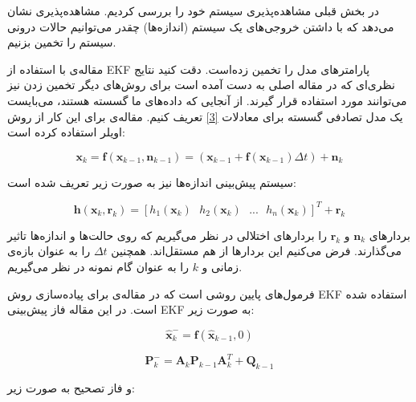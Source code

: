 \documentclass[11pt, fleqn]{article}
\begin{document}
\begin{multicols}{2}
در بخش قبلی مشاهده‌پذیری سیستم خود را بررسی کردیم. مشاهده‌پذیری نشان‌ می‌دهد که با داشتن خروجی‌های یک سیستم (اندازه‌ها) چقدر می‌توانیم حالات درونی سیستم را تخمین بزنیم.

مقاله‌ی 
\cite{main}
 با استفاده از EKF پارامترهای مدل را تخمین زده‌است. دقت کنید نتایج نظری‌ای که در مقاله اصلی به دست آمده است برای روش‌های دیگر تخمین زدن نیز می‌توانند مورد استفاده قرار گیرند. 
	از آنجایی که داده‌های ما گسسته هستند، می‌بایست یک مدل تصادفی گسسته برای معادلات
\ref{3}
	 تعریف کنیم. مقاله‌ی 
\cite{main}
	  برای این کار از روش اویلر استفاده کرده است:

\useshortskip
\begin{LTR}
\begin{equation}
\label{17}
\mathbf{x}_k = \mathbf{f}({\mathbf{x}_{k-1}},\mathbf{n}_{k-1}) = (\mathbf{x}_{k-1}+ \mathbf{f}(\mathbf{x}_{k-1})\Delta t)+\mathbf{n}_k
\end{equation}
\end{LTR}

	سیستم پیش‌بینی اندازه‌ها نیز به صورت زیر تعریف شده است:
	
\useshortskip
\begin{LTR}
\begin{equation}
\label{18}
\mathbf{h}(\mathbf{x}_k,\mathbf{r}_k) = [h_{1}(\mathbf{x}_k) \ \ \  h_{2}(\mathbf{x}_k)  \ \ \  ...  \ \ \  h_{n}(\mathbf{x}_k)]^{T} + \mathbf{r}_k
\end{equation}
\end{LTR}

بردارهای
$\mathbf{n}_k$
	 و 
$\mathbf{r}_k$
	 را بردار‌های اختلالی
در نظر می‌گیریم که روی حالت‌ها و اندازه‌ها تاثیر می‌گذارند. فرض می‌کنیم این بردارها از هم مستقل‌اند. 
همچنین 
$\Delta t$
	  را به عنوان بازه‌ی زمانی و
$k$
	را به عنوان گام نمونه در نظر می‌گیریم.
	 
فرمول‌های پایین روشی است که در مقاله‌ی
\cite{main}
 برای پیاده‌سازی روش 
EKF
استفاده شده است. در این مقاله فاز پیش‌بینی EKF به صورت زیر:

\useshortskip
\begin{LTR}
\begin{equation}
\label{19}
\hat{\mathbf{x}}^{-}_{k} = \mathbf{f}(\hat{\mathbf{x}}_{k-1},0)
\end{equation}
\end{LTR}

\useshortskip
\begin{LTR}
\begin{equation}
\label{20}
\mathbf{P}^{-}_{k} = \mathbf{A}_{k}\mathbf{P}_{k-1}\mathbf{A}^{T}_{k}+\mathbf{Q}_{k-1}
\end{equation}
\end{LTR}
و فاز تصحیح به صورت زیر:



\end{multicols}
\end{document}

